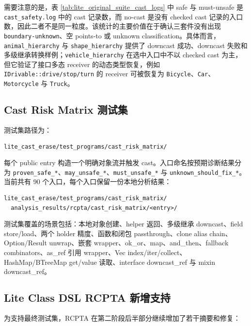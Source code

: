 \documentclass[10.5pt,compsoc,UTF8]{cjc}
\theoremstyle{mystyle}
\begin{document}
需要注意的是，表 \ref{tab:lite_original_suite_cast_logs} 中 safe 与 must-unsafe 是 \texttt{cast\_safety.log} 中的 cast 记录数，而 no-cast 是没有 checked cast 记录的入口数，因此二者不是同一粒度。该统计的主要价值在于确认三套件没有出现 \texttt{boundary-unknown}、空 points-to 或 unknown classification。具体而言，\texttt{animal\_hierarchy} 与 \texttt{shape\_hierarchy} 提供了 downcast 成功、downcast 失败和多级继承转换样例；\texttt{vehicle\_hierarchy} 在选中入口中不以 checked cast 为主，但它验证了接口多态 receiver 的动态类型恢复，例如 \texttt{IDrivable::drive/stop/turn} 的 receiver 可被恢复为 \texttt{Bicycle}、\texttt{Car}、\texttt{Motorcycle} 与 \texttt{Truck}。

\subsection{Cast Risk Matrix 测试集}

测试集路径为：

\begin{lstlisting}
lite_cast_erase/test_programs/cast_risk_matrix/
\end{lstlisting}

每个 public entry 构造一个明确对象流并触发 cast。入口命名按预期诊断结果分为 \texttt{proven\_safe\_*}、\texttt{may\_unsafe\_*}、\texttt{must\_unsafe\_*} 与 \texttt{unknown\_should\_fix\_*}。当前共有 90 个入口，每个入口保留一份本地分析结果：

\begin{lstlisting}
lite_cast_erase/test_programs/cast_risk_matrix/
  analysis_results/rcpta/cast_risk_matrix/<entry>/
\end{lstlisting}

测试集覆盖的场景包括：本地对象创建、helper 返回、多级继承 downcast、field store/load、两个 holder 精度、函数和闭包 passthrough、clone alias chain、Option/Result unwrap、嵌套 wrapper、ok\_or、map、and\_then、fallback combinators、as\_ref 引用 wrapper、Vec index/iter/collect、HashMap/BTreeMap get/value 读取、interface downcast\_ref 与 mixin downcast\_ref。

\subsection{Lite Class DSL RCPTA 新增支持}

为支持最终测试集，RCPTA 在第二阶段后半部分继续增加了若干摘要和修复：
\end{document}
